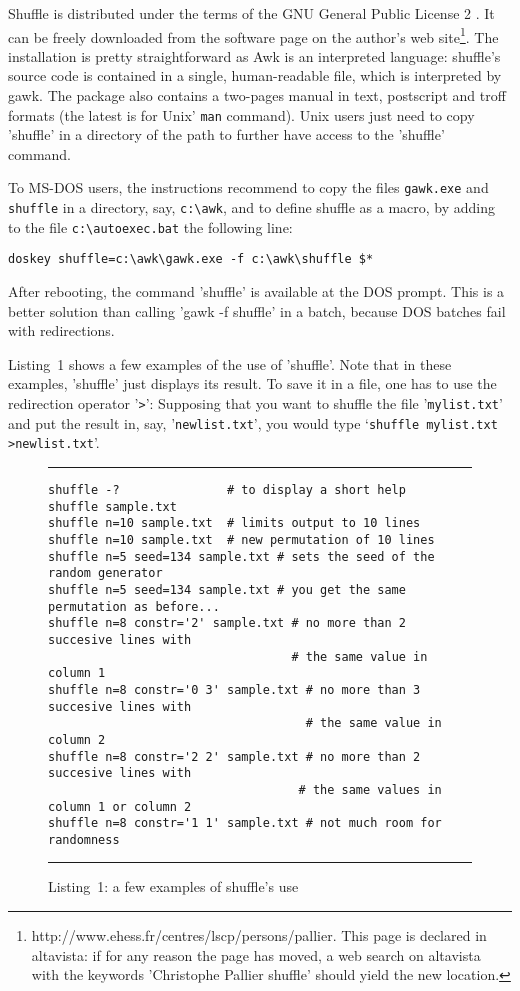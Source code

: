 \documentclass[doc]{apa}
\newcommand{\href}[2]{#2}
\newcommand{\shuffle}{\texttt{shuffle}}
\begin{document}
Shuffle is distributed under the terms of the GNU General Public
License 2 \cite{GPL}. It can be freely downloaded from the software
page on the author's web
site\footnote{\href{http://www.ehess.fr/centres/lscp/persons/pallier}{http://www.ehess.fr/centres/lscp/persons/pallier}.
  This page is declared in altavista: if for any reason the page has
  moved, a web search on altavista with the keywords 'Christophe
  Pallier shuffle' should yield the new location.}.  The installation
is pretty straightforward as Awk is an interpreted language: shuffle's
source code is contained in a single, human-readable file, which is
interpreted by gawk.  The package also contains a two-pages manual in
text, postscript and troff formats (the latest is for Unix' \verb|man|
command). Unix users just need to copy 'shuffle' in a directory of the
path to further have access to the 'shuffle' command.

To MS-DOS users, the instructions recommend to copy the files
\verb|gawk.exe| and \verb|shuffle| in a directory, say, \verb|c:\awk|,
and to define shuffle as a macro, by adding to the file
\verb|c:\autoexec.bat| the following line:

\begin{verbatim}
doskey shuffle=c:\awk\gawk.exe -f c:\awk\shuffle $* 
\end{verbatim}
 
After rebooting, the command 'shuffle' is available at the DOS prompt.
This is a better solution than calling 'gawk -f shuffle' in a batch,
because DOS batches fail with redirections.

Listing~1 shows a few examples of the use of 'shuffle'. Note that in
these examples, 'shuffle' just displays its result. To save it in a
file, one has to use the redirection operator '\verb|>|': Supposing
that you want to shuffle the file '\verb|mylist.txt|' and put the
result in, say, '\verb|newlist.txt|', you would type 
`\verb|shuffle mylist.txt >newlist.txt|'.

\begin{figure}[tb]
\caption{Listing~1: a few examples of shuffle's use}
\hrule\vspace*{4pt}
\begin{verbatim}
shuffle -?               # to display a short help
shuffle sample.txt
shuffle n=10 sample.txt  # limits output to 10 lines
shuffle n=10 sample.txt  # new permutation of 10 lines
shuffle n=5 seed=134 sample.txt # sets the seed of the random generator
shuffle n=5 seed=134 sample.txt # you get the same permutation as before...
shuffle n=8 constr='2' sample.txt # no more than 2 succesive lines with
                                  # the same value in column 1
shuffle n=8 constr='0 3' sample.txt # no more than 3 succesive lines with
                                    # the same value in column 2
shuffle n=8 constr='2 2' sample.txt # no more than 2 succesive lines with
                                   # the same values in column 1 or column 2
shuffle n=8 constr='1 1' sample.txt # not much room for randomness
\end{verbatim}
\hrule
\end{figure}
\end{document}
